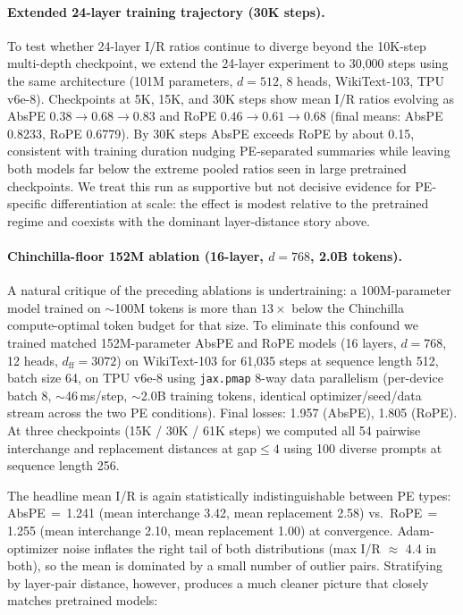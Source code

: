 \documentclass{article}
\begin{document}
\paragraph{Extended 24-layer training trajectory (30K steps).}
To test whether 24-layer I/R ratios continue to diverge beyond the 10K-step multi-depth checkpoint, we extend the 24-layer experiment to 30{,}000 steps using the same architecture (101M parameters, $d{=}512$, 8 heads, WikiText-103, TPU v6e-8). Checkpoints at 5K, 15K, and 30K steps show mean I/R ratios evolving as AbsPE $0.38{\to}0.68{\to}0.83$ and RoPE $0.46{\to}0.61{\to}0.68$ (final means: AbsPE 0.8233, RoPE 0.6779). By 30K steps AbsPE exceeds RoPE by about 0.15, consistent with training duration nudging PE-separated summaries while leaving both models far below the extreme pooled ratios seen in large pretrained checkpoints. We treat this run as supportive but not decisive evidence for PE-specific differentiation at scale: the effect is modest relative to the pretrained regime and coexists with the dominant layer-distance story above.

\paragraph{Chinchilla-floor 152M ablation (16-layer, $d{=}768$, 2.0B tokens).}
A natural critique of the preceding ablations is undertraining: a 100M-parameter model trained on $\sim$100M tokens is more than $13\times$ below the Chinchilla compute-optimal token budget for that size. To eliminate this confound we trained matched 152M-parameter AbsPE and RoPE models (16 layers, $d{=}768$, 12 heads, $d_\text{ff}{=}3072$) on WikiText-103 for 61{,}035 steps at sequence length 512, batch size 64, on TPU v6e-8 using \texttt{jax.pmap} 8-way data parallelism (per-device batch 8, $\sim$46\,ms/step, $\sim$2.0B training tokens, identical optimizer/seed/data stream across the two PE conditions). Final losses: 1.957 (AbsPE), 1.805 (RoPE). At three checkpoints (15K / 30K / 61K steps) we computed all 54 pairwise interchange and replacement distances at gap${\leq}4$ using 100 diverse prompts at sequence length 256.

The headline mean I/R is again statistically indistinguishable between PE types: AbsPE\,$=$\,1.241 (mean interchange 3.42, mean replacement 2.58) vs.\ RoPE\,$=$\,1.255 (mean interchange 2.10, mean replacement 1.00) at convergence. Adam-optimizer noise inflates the right tail of both distributions (max I/R $\approx$ 4.4 in both), so the mean is dominated by a small number of outlier pairs. Stratifying by layer-pair distance, however, produces a much cleaner picture that closely matches pretrained models:
\end{document}
